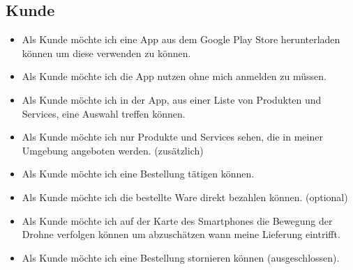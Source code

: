 \subsection{Kunde}
\begin{itemize}
	\item Als Kunde möchte ich eine App aus dem Google Play Store herunterladen können um diese verwenden zu können.
	\item Als Kunde möchte ich die App nutzen ohne mich anmelden zu müssen.
	\item Als Kunde möchte ich in der App, aus einer Liste von Produkten und Services, eine Auswahl treffen können.
	\item Als Kunde möchte ich nur Produkte und Services sehen, die in meiner Umgebung angeboten werden. (zusätzlich)
	\item Als Kunde möchte ich eine Bestellung tätigen können.
	\item Als Kunde möchte ich die bestellte Ware direkt bezahlen können. (optional)
	\item Als Kunde möchte ich auf der Karte des Smartphones die Bewegung der Drohne verfolgen können um abzuschätzen wann meine Lieferung eintrifft.
	\item Als Kunde möchte ich eine Bestellung stornieren können (ausgeschlossen).
\end{itemize}

